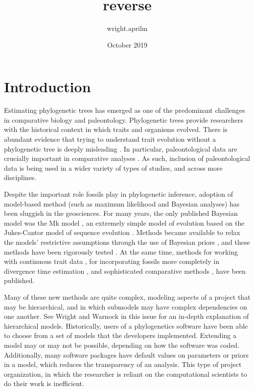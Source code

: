 \documentclass{article}
\title{reverse}
\author{wright.aprilm }
\date{October 2019}
\begin{document}
\maketitle
\section{Introduction}

Estimating phylogenetic trees has emerged as one of the predominant challenges in comparative biology and paleontology.
Phylogenetic trees provide researchers with the historical context in which traits and organisms evolved.
There is abundant evidence that trying to understand trait evolution without a phylogenetic tree is deeply misleading \cite{felsenstein1985, uyeda2018}.
In particular, paleontological data are crucially important in comparative analyses \citep{rabosky2010, slater2012}.
As such, inclusion of paleontological data is being used in a wider variety of types of studies, and across more disciplines.

Despite the important role fossils play in phylogenetic inference, adoption of model-based method (such as maximum likelihood and Bayesian analyses) has been sluggish in the geosciences.
For many years, the only published Bayesian model was the Mk model \citep{Lewis2001}, an extremely simple model of evolution based on the Jukes-Cantor model of sequence evolution \citep{Jukes1969}.
Methods became available to relax the models' restrictive assumptions through the use of Bayesian priors \citep{Nylander2004}, and these methods have been rigorously tested \citep{Wright2016}.
At the same time, methods for working with continuous trait data \citep{parins2018}, for incorporating fossils more completely in divergence time estimation \citep{Stadler2010, Heath2014}, and sophisticated comparative methods \citep{Beaulieu2013, Rabosky2015, Beaulieu2016, Hoehna2019, zenil2019},  have been published.

Many of these new methods are quite complex, modeling aspects of a project that may be hierarchical, and in which submodels may have complex dependencies on one another.
See Wright and Warnock in this issue for an in-depth explanation of hierarchical models.
Historically, users of a phylogenetics software have been able to choose from a set of  models that the developers implemented.
Extending a model may or may not be possible, depending on how the software was coded. 
Additionally, many software packages have default values on parameters or priors in a model, which reduces the transparency of an analysis.
This type of project organization, in which the researcher is reliant on the computational scientists to do their work is inefficient.
\end{document}
